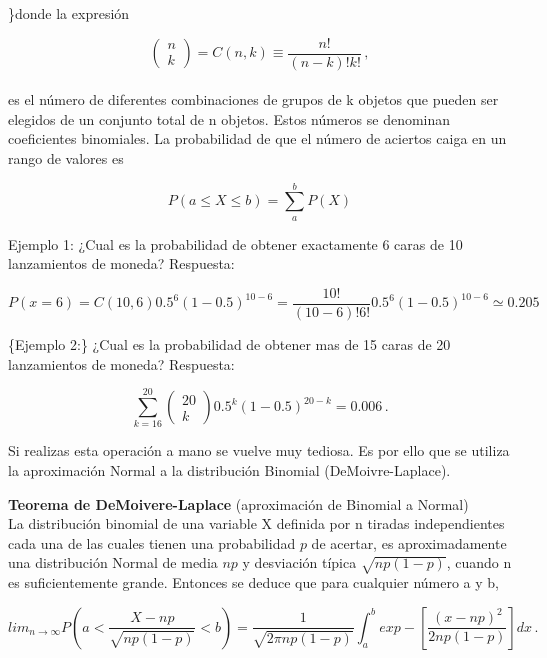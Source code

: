 \documentclass[
]{agujournal2019}
\begin{document}
\noindent\}donde la expresión

\[\left( \begin{array}{c}
 n \\ k
       \end{array} \right)=C(n,k)\equiv\frac{n!}{(n-k)!k!}\,,\]\\

es el número de diferentes combinaciones de grupos de k objetos que
pueden ser elegidos de un conjunto total de n objetos. Estos números se
denominan coeficientes binomiales. La probabilidad de que el número de
aciertos caiga en un rango de valores es

\[P(a\le X\le b)=\sum^b_a P(X)\]

\vspace{0.5cm}

Ejemplo 1: ¿Cual es la probabilidad de obtener exactamente 6 caras de 10
lanzamientos de moneda? Respuesta:

\[P(x=6) = C(10,6)0.5^6(1-0.5)^{10-6} = \frac{10!}{(10-6)!6!}0.5^6(1-0.5)^{10-6} \simeq 0.205\]

\vspace{0.5cm}

\{\noindent  Ejemplo 2:\} ¿Cual es la probabilidad de obtener mas de 15
caras de 20 lanzamientos de moneda? Respuesta:

\[\sum^{20}_{k=16} \left( \begin{array}{c} 20 \\ k
       \end{array} \right) 0.5^k(1-0.5)^{20-k}=0.006\,.\]

Si realizas esta operación a mano se vuelve muy tediosa. Es por ello que
se utiliza la aproximación Normal a la distribución Binomial
(DeMoivre-Laplace).

\vspace{0.5cm}

\textbf{Teorema de DeMoivere-Laplace} (aproximación de Binomial a
Normal)\\

La distribución binomial de una variable X definida por n tiradas
independientes cada una de las cuales tienen una probabilidad \(p\) de
acertar, es aproximadamente una distribución Normal de media \(np\) y
desviación típica \(\sqrt{np(1-p)}\), cuando n es suficientemente
grande. Entonces se deduce que para cualquier número a y b,

\[lim_{n\rightarrow\infty} P \left( a<\frac{X-np}{\sqrt{np(1-p)}}<b\right)= \frac{1}{\sqrt{2\pi np(1-p)}}\int^b_a exp-\left[\frac{(x-np)^2}{2np(1-p)}\right]dx\,.\]\\
\end{document}
